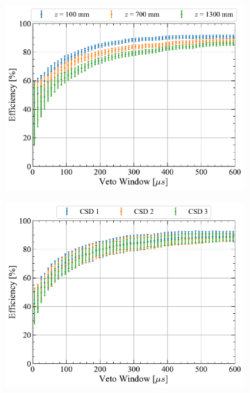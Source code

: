 \begin{enumerate}
    \begin{figure}[!ht]
    	\centering
    	\begin{subfigure}[b]{0.48\textwidth}
    		\centering
    		\includegraphics[width=\textwidth]{figures/VetoEfficiency/Eff_AmLi_Total_AllHeights.pdf}
            \caption{}
    		\label{fig:VetoEff/VetoEffPositionDependenceCSD}
    	\end{subfigure}
    	\hfill
    	\begin{subfigure}[b]{0.48\textwidth}
    		\centering
    		\includegraphics[width=\textwidth]{figures/VetoEfficiency/Eff_AmLi_Total_AllCSD.pdf}
    		\caption{}
            \label{fig:VetoEff/VetoEffPositionDependenceZPos}

\end{subfigure}
\end{figure}
\end{enumerate}
